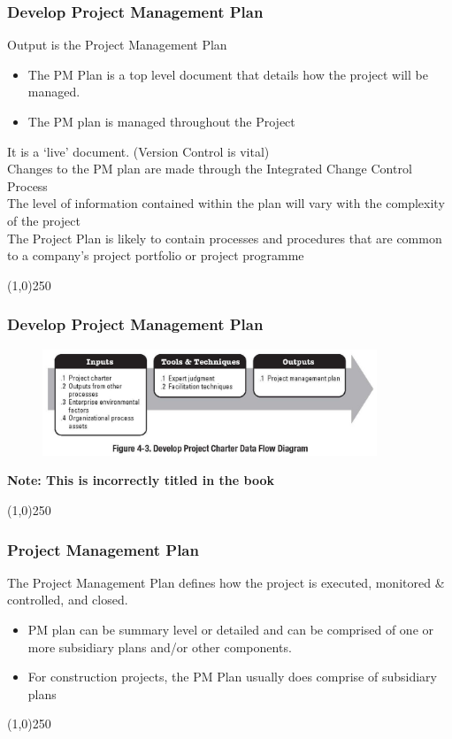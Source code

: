 \begin{frame}
\frametitle{Develop Project Management Plan}
Output is the Project Management Plan
\begin{itemize}
	\item The PM Plan is a top level document that details how the project will be managed.
	\item The PM plan is managed throughout the Project
\end{itemize}
It is a `live' document.  (Version Control is vital)\\
Changes to the PM plan are made through the Integrated Change Control Process\\
The level of information contained within the plan will vary with the complexity of the project\\
The Project Plan is likely to contain processes and procedures that are common to a company's project portfolio or project programme\\
\end{frame}\begin{center}\line(1,0){250}\end{center}
%
%

\begin{frame}
\frametitle{Develop Project Management Plan}
\begin{figure}
	\centering
		\includegraphics[width = 10cm]{images/fig4-3.jpg}
	\label{fig:4-3}
\end{figure}
\textbf{Note: This is incorrectly titled in the book}
\end{frame}\begin{center}\line(1,0){250}\end{center}
%
%

\begin{frame}
\frametitle{Project Management Plan}
The Project Management Plan defines how the project is executed, monitored \& controlled, and closed.  
\begin{itemize}
	\item PM plan can be summary level or detailed and can be comprised of one or more subsidiary plans and/or other components.
	\item For construction projects, the PM Plan usually does comprise of subsidiary plans
\end{itemize}	
	
\end{frame}\begin{center}\line(1,0){250}\end{center}
%
%


